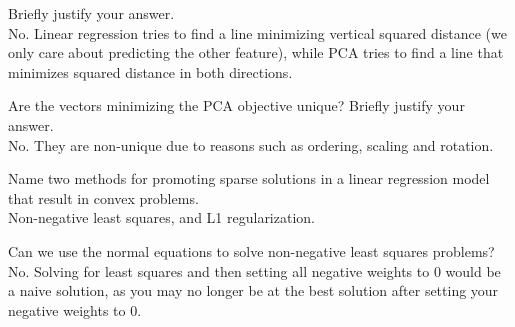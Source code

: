 \documentclass{article}
\def\gre#1{{\color{gre}#1}}
\begin{document}
{ Briefly justify your answer.
\\
\gre{
No. Linear regression tries to find a line minimizing vertical squared distance (we only care about predicting the other feature), while PCA tries to find a line that minimizes squared distance in both directions.
}
\item Are the vectors minimizing the PCA objective unique? Briefly justify your answer.
\\
\gre{
No. They are non-unique due to reasons such as ordering, scaling and rotation.
}
\item Name two methods for promoting sparse solutions in a linear regression model that result in convex problems.
\\
\gre{
Non-negative least squares, and L1 regularization.
}
\item Can we use the normal equations to solve non-negative least squares problems?
\\
\gre{
No. Solving for least squares and then setting all negative weights to 0 would be a naive solution, as you may no longer be at the best solution after setting your negative weights to 0.
}
}
\end{document}
